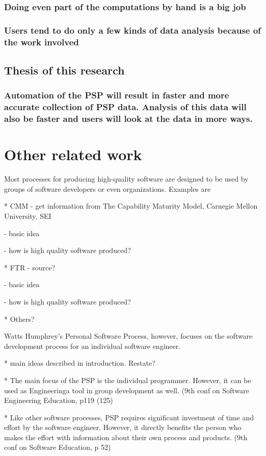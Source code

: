 \subsection{Doing even part of the computations by hand is a big job}
\subsection{Users tend to do only a few kinds of data analysis because of the work involved}
\section{Thesis of this research}
\subsection{Automation of the PSP will result in faster and more accurate collection of PSP data.  Analysis of this data will also be faster and users will look at the data 
in more ways.}
\chapter{Other related work}

Most processes for producing high-quality software are designed to be used by groups of
software developers or even organizations.  Examples are 

* CMM - get information from The Capability Maturity Model, Carnegie Mellon University, SEI

  - basic idea

  - how is high quality software produced?

* FTR  - source?

  - basic idea

  - how is high quality software produced?

* Others?


Watts Humphrey's Personal Software Process, however, focuses on the software development
process for an individual software engineer.

* main ideas described in introduction.  Restate?

* The main focus of the PSP is the individual programmer.  However, it can be used as 
Engineeringa tool in group development as well.  (9th conf on Software Engineering Education, p119 (125)

* Like other software processes, PSP requires significant investment of time and effort by the
  software engineer.  However, it directly benefits the person who makes the effort with 
  information about their own process and products. (9th conf on Software  Education,   
  p 52)
 
